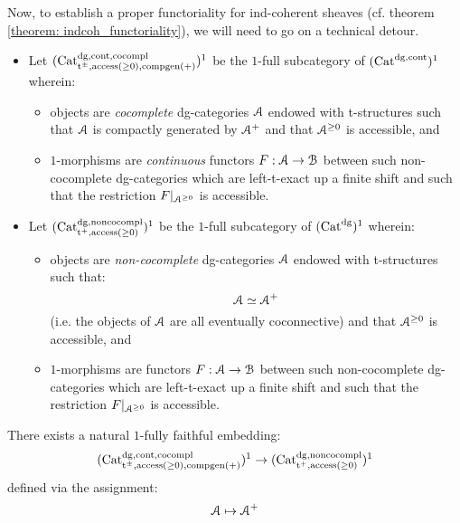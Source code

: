                 Now, to establish a proper functoriality for ind-coherent sheaves (cf. theorem \ref{theorem: indcoh_functoriality}), we will need to go on a technical detour.
                \begin{convention}
                    \noindent
                    \begin{itemize}
                        \item Let $(\mathrm{Cat}^{\mathrm{dg}, \mathrm{cont}, \mathrm{co}\mathrm{compl}}_{\mathrm{t}^{\pm}, \mathrm{access}(\geq 0), \mathrm{comp}\mathrm{gen}(+)})^1$ be the $1$-full subcategory of $(\mathrm{Cat}^{\mathrm{dg}, \mathrm{cont}})^1$ wherein:
                            \begin{itemize}
                                \item objects are \textit{cocomplete} dg-categories $\mathcal{A}$ endowed with t-structures such that $\mathcal{A}$ is compactly generated by $\mathcal{A}^+$ and that $\mathcal{A}^{\geq 0}$ is accessible, and
                                \item $1$-morphisms are \textit{continuous} functors $F: \mathcal{A} \to \mathcal{B}$ between such non-cocomplete dg-categories which are left-t-exact up a finite shift and such that the restriction $F|_{\mathcal{A}^{\geq 0}}$ is accessible. 
                            \end{itemize}
                        \item Let $(\mathrm{Cat}^{\mathrm{dg}, \mathrm{non}\mathrm{co}\mathrm{compl}}_{\mathrm{t}^+, \mathrm{access}(\geq 0)})^1$ be the $1$-full subcategory of $(\mathrm{Cat}^{\mathrm{dg}})^1$ wherein:
                            \begin{itemize}
                                \item objects are \textit{non-cocomplete} dg-categories $\mathcal{A}$ endowed with t-structures such that:
                                    $$\mathcal{A} \simeq \mathcal{A}^+$$
                                (i.e. the objects of $\mathcal{A}$ are all eventually coconnective) and that $\mathcal{A}^{\geq 0}$ is accessible, and
                                \item $1$-morphisms are functors $F: \mathcal{A} \to \mathcal{B}$ between such non-cocomplete dg-categories which are left-t-exact up a finite shift and such that the restriction $F|_{\mathcal{A}^{\geq 0}}$ is accessible. 
                            \end{itemize}
                    \end{itemize}
                \end{convention}
                \begin{lemma} \label{lemma: selecting_a_compact_generator}
                    There exists a natural $1$-fully faithful embedding:
                        $$(\mathrm{Cat}^{\mathrm{dg}, \mathrm{cont}, \mathrm{co}\mathrm{compl}}_{\mathrm{t}^{\pm}, \mathrm{access}(\geq 0), \mathrm{comp}\mathrm{gen}(+)})^1 \to (\mathrm{Cat}^{\mathrm{dg}, \mathrm{non}\mathrm{co}\mathrm{compl}}_{\mathrm{t}^+, \mathrm{access}(\geq 0)})^1$$
                    defined via the assignment:
                        $$\mathcal{A} \mapsto \mathcal{A}^+$$
                \end{lemma}
